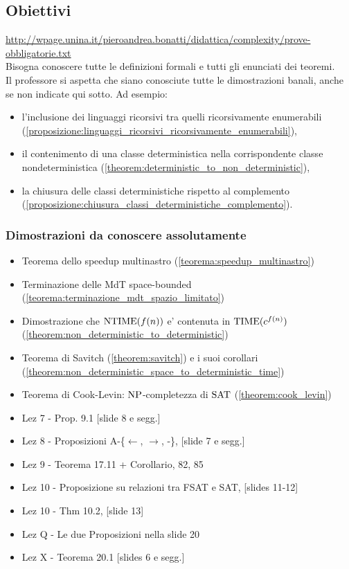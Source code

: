 \newpage
\subsection{Obiettivi}
\url{http://wpage.unina.it/pieroandrea.bonatti/didattica/complexity/prove-obbligatorie.txt}\\

Bisogna conoscere tutte le definizioni formali e tutti gli enunciati dei teoremi.\\
Il professore si aspetta che siano conosciute tutte le dimostrazioni banali,
anche se non indicate qui sotto.
Ad esempio:
\begin{itemize}
\item l'inclusione dei linguaggi ricorsivi tra quelli ricorsivamente enumerabili (\ref{proposizione:linguaggi_ricorsivi_ricorsivamente_enumerabili}),
\item il contenimento di una classe deterministica nella corrispondente classe nondeterministica (\ref{theorem:deterministic_to_non_deterministic}),
\item la chiusura delle classi deterministiche rispetto al complemento (\ref{proposizione:chiusura_classi_deterministiche_complemento}).
\end{itemize}

\subsubsection{Dimostrazioni da conoscere assolutamente}
\begin{itemize}
\item Teorema dello speedup multinastro (\ref{teorema:speedup_multinastro})
\item Terminazione delle MdT space-bounded  (\ref{teorema:terminazione_mdt_spazio_limitato})
\item Dimostrazione che $\text{NTIME}(f(n))$ e' contenuta in $\text{TIME}(c^{f(n)})$  (\ref{theorem:non_deterministic_to_deterministic})
\item Teorema di Savitch (\ref{theorem:savitch}) e i suoi corollari (\ref{theorem:non_deterministic_space_to_deterministic_time})
\item Teorema di Cook-Levin: $\text{NP}$-completezza di $\text{SAT}$ (\ref{theorem:cook_levin})
\\
\item Lez 7 - Prop. 9.1 [slide 8 e segg.]
\item Lez 8 - Proposizioni A-\{$\leftarrow$, $\rightarrow$, -\}, [slide 7 e segg.]
\item Lez 9 - Teorema 17.11 + Corollario, 82, 85
\item Lez 10 - Proposizione su relazioni tra FSAT e SAT, [slides 11-12]
\item Lez 10 - Thm 10.2, [slide 13]
\item Lez Q - Le due Proposizioni nella slide 20
\item Lez X - Teorema 20.1 [slides 6 e segg.]
\end{itemize}

